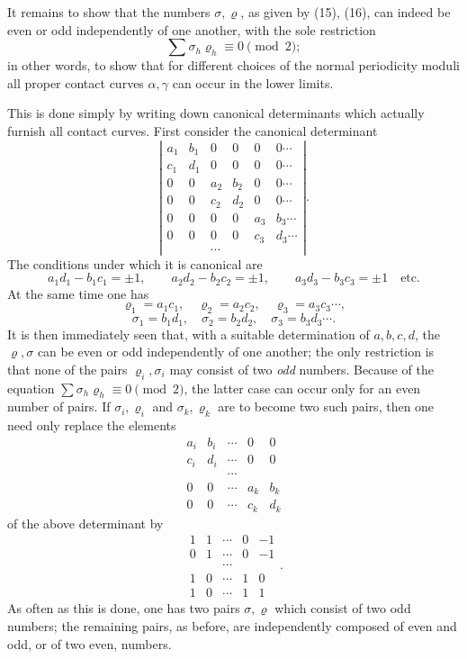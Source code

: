\documentclass[10pt]{article}
\begin{document}
It remains to show that the numbers \(\sigma,\varrho\), as given by (15), (16), can indeed be even or odd independently of one another, with the sole restriction
\[
\sum\sigma_h\varrho_h\equiv0\pmod{2};
\]
in other words, to show that for different choices of the normal periodicity moduli all proper contact curves \(\alpha,\gamma\) can occur in the lower limits.

This is done simply by writing down canonical determinants which actually furnish all contact curves. First consider the canonical determinant
\[
\left|
\begin{array}{cccccc}
a_1&b_1&0&0&0&0\cdots\\
c_1&d_1&0&0&0&0\cdots\\
0&0&a_2&b_2&0&0\cdots\\
0&0&c_2&d_2&0&0\cdots\\
0&0&0&0&a_3&b_3\cdots\\
0&0&0&0&c_3&d_3\cdots\\
&&\cdots
\end{array}
\right|.
\]
The conditions under which it is canonical are
\[
a_1d_1-b_1c_1=\pm1,\qquad
a_2d_2-b_2c_2=\pm1,\qquad
a_3d_3-b_3c_3=\pm1\quad\text{etc.}
\]
At the same time one has
\[
\varrho_1=a_1c_1,\quad\varrho_2=a_2c_2,\quad\varrho_3=a_3c_3\cdots,
\]
\[
\sigma_1=b_1d_1,\quad\sigma_2=b_2d_2,\quad\sigma_3=b_3d_3\cdots .
\]
It is then immediately seen that, with a suitable determination of \(a,b,c,d\), the \(\varrho,\sigma\) can be even or odd independently of one another; the only restriction is that none of the pairs \(\varrho_i,\sigma_i\) may consist of two \emph{odd} numbers. Because of the equation \(\sum\sigma_h\varrho_h\equiv0\pmod{2}\), the latter case can occur only for an even number of pairs. If \(\sigma_i,\varrho_i\) and \(\sigma_k,\varrho_k\) are to become two such pairs, then one need only replace the elements
\[
\begin{array}{ccccc}
a_i&b_i&\cdots&0&0\\
c_i&d_i&\cdots&0&0\\
&&\cdots\\
0&0&\cdots&a_k&b_k\\
0&0&\cdots&c_k&d_k
\end{array}
\]
of the above determinant by
\[
\begin{array}{ccccc}
1&1&\cdots&0&-1\\
0&1&\cdots&0&-1\\
&&\cdots\\
1&0&\cdots&1&0\\
1&0&\cdots&1&1
\end{array}.
\]
As often as this is done, one has two pairs \(\sigma,\varrho\) which consist of two odd numbers; the remaining pairs, as before, are independently composed of even and odd, or of two even, numbers.
\end{document}
